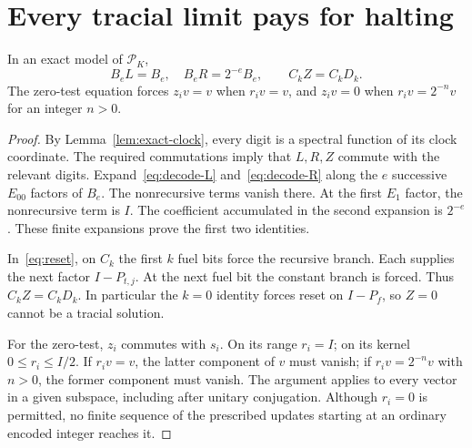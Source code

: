 \section{Every tracial limit pays for halting}\label{sec:forcing}
\begin{lemma}\label{lem:initialization}
In an exact model of $\mathcal P_K$,
\begin{equation}\label{eq:forced-decoding}
 B_eL=B_e,\quad B_eR=2^{-e}B_e,\qquad C_kZ=C_kD_k.
\end{equation}
The zero-test equation forces $z_i v=v$ when $r_i v=v$, and $z_i v=0$ when $r_i v=2^{-n}v$ for an integer $n>0$.
\end{lemma}
\begin{proof}
By Lemma~\ref{lem:exact-clock}, every digit is a spectral function of its clock coordinate. The required commutations imply that $L,R,Z$ commute with the relevant digits. Expand~\eqref{eq:decode-L} and~\eqref{eq:decode-R} along the $e$ successive $E_{00}$ factors of $B_e$. The nonrecursive terms vanish there. At the first $E_1$ factor, the nonrecursive term is $I$. The coefficient accumulated in the second expansion is $2^{-e}$. These finite expansions prove the first two identities.

In~\eqref{eq:reset}, on $C_k$ the first $k$ fuel bits force the recursive branch. Each supplies the next factor $I-P_{t,j}$. At the next fuel bit the constant branch is forced. Thus $C_kZ=C_kD_k$. In particular the $k=0$ identity forces reset on $I-P_f$, so $Z=0$ cannot be a tracial solution.

For the zero-test, $z_i$ commutes with $s_i$. On its range $r_i=I$; on its kernel $0\le r_i\le I/2$. If $r_iv=v$, the latter component of $v$ must vanish; if $r_iv=2^{-n}v$ with $n>0$, the former component must vanish. The argument applies to every vector in a given subspace, including after unitary conjugation. Although $r_i=0$ is permitted, no finite sequence of the prescribed updates starting at an ordinary encoded integer reaches it.
\end{proof}


